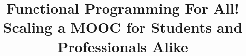 \documentclass{sig-alternate}
\begin{document}
\setmonofont[Scale=0.8,BoldFont={Consolas Bold}]{Consolas}
%

\title{Functional Programming For All!\\Scaling a MOOC for Students and Professionals Alike}

%
%
%
%
%
\end{document}
